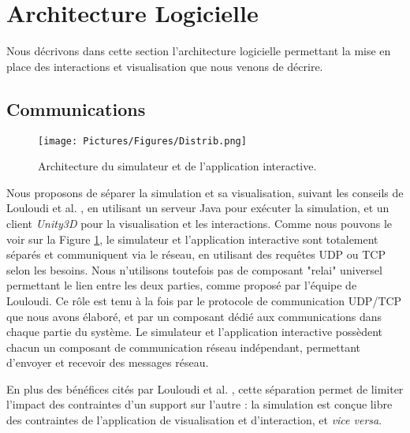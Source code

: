 	\section{Architecture Logicielle}
	
	Nous décrivons dans cette section l'architecture logicielle permettant la mise en place des interactions et visualisation que nous venons de décrire.
	
	\subsection{Communications}

	\begin{figure}
	\centering
	\texttt{[image: Pictures/Figures/Distrib.png]}
	\caption{Architecture du simulateur et de l'application interactive.}
	\label{archi}
	\end{figure}
	
	
	Nous proposons de séparer la simulation et sa visualisation, suivant les conseils de Louloudi et al. \cite{louloudi_new_2012}, en utilisant un serveur Java pour exécuter la simulation, et un client \textit{Unity3D} pour la visualisation et les interactions. Comme nous pouvons le voir sur la Figure \ref{archi}, le simulateur et l'application interactive sont totalement séparés et communiquent via le réseau, en utilisant des requêtes UDP ou TCP selon les besoins. Nous n'utilisons toutefois pas de composant "relai" universel permettant le lien entre les deux parties, comme proposé par l'équipe de Louloudi. Ce rôle est tenu à la fois par le protocole de communication UDP/TCP que nous avons élaboré, et par un composant dédié aux communications dans chaque partie du système. Le simulateur et l'application interactive possèdent chacun un composant de communication réseau indépendant, permettant d'envoyer et recevoir des messages réseau.
	
	En plus des bénéfices cités par Louloudi et al. \cite{louloudi_new_2012}, cette séparation permet de limiter l'impact des contraintes d'un support sur l'autre : la simulation est conçue libre des contraintes de l'application de visualisation et d'interaction, et \textit{vice versa}. 	
	
